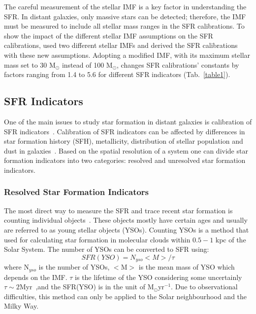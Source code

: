 The careful measurement of the stellar IMF is a key factor in understanding the SFR. 
In distant galaxies, only massive stars can be detected; therefore, the IMF must be measured to include all stellar mass ranges in the SFR calibrations. 
To show the impact of the different stellar IMF assumptions on the SFR calibrations, \cite{Calzetti13} used two different stellar IMFs and derived the SFR calibrations with these new assumptions.
Adopting a modified \cite{Kroupa01} IMF, with its maximum stellar mass set to 30 M$_{\odot}$ instead of 100 M$_{\odot}$, changes SFR calibrations' constants by factors ranging from 1.4 to 5.6 for different SFR indicators (Tab.~\ref{table1}). 

\subsection{SFR Indicators}

One of the main issues to study star formation in distant galaxies is calibration of SFR indicators~\citep[e.g.,][]{Lee10}. 
Calibration of SFR indicators can be affected by differences in star formation history (SFH), metallicity, distribution of stellar population and dust in galaxies~\citep{Calzetti13}. 
Based on the spatial resolution of a system one can divide star formation indicators into two categories: resolved and unresolved star formation indicators.

\subsubsection{Resolved Star Formation Indicators}
The most direct way to measure the SFR and trace recent star formation is counting individual objects~\citep{Kennicutt12}. 
These objects mostly have certain ages and usually are referred to as young stellar objects (YSOs). 
Counting YSOs is a method that used for calculating star formation in molecular clouds within $0.5- 1$ kpc of the Solar System. 
The number of YSOs can be converted to SFR using: 
\begin{equation}
SFR(YSO) = N_{yso} <M>/\tau 
\end{equation}
where N$_{yso}$ is the number of YSOs, $<$M$>$ is the mean mass of YSO which depends on the IMF. 
$\tau$ is the lifetime of the YSO considering some uncertainly $\tau \sim 2$Myr~\citep{Evans09},and the SFR(YSO) is in the unit of M$_{\odot}$yr$^{-1}$. 
Due to observational difficulties, this method can only be applied to the Solar neighbourhood and the Milky Way. 

